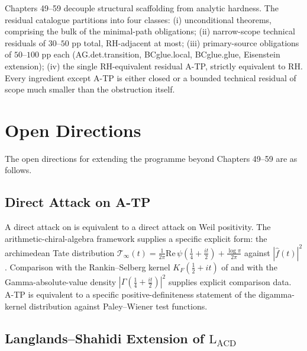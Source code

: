 \begin{remark}
\label{v4-arith:w5-synth:rem:irreducible}
Chapters 49--59 decouple structural scaffolding from analytic hardness.
The residual catalogue partitions into four classes: (i) unconditional
theorems, comprising the bulk of the minimal-path obligations; (ii)
narrow-scope technical residuals of \(30\)--\(50\) pp total, RH-adjacent
at most; (iii) primary-source obligations of \(50\)--\(100\) pp each
(AG.det.transition, BCglue.local, BCglue.glue, Eisenstein extension);
(iv) the single RH-equivalent residual A-TP, strictly equivalent to
RH. Every ingredient except A-TP is either closed or a bounded
technical residual of scope much smaller than the obstruction itself.
\end{remark}

\section{Open Directions}
\label{v4-arith:w5-synth:path-forward}

The open directions for extending the programme beyond Chapters 49--59
are as follows.

\subsection{Direct Attack on A-TP}
\label{v4-arith:w5-synth:direct-ATP}

A direct attack on 
is equivalent to a direct attack on Weil positivity. The
arithmetic-chiral-algebra framework supplies a specific explicit
form: the archimedean Tate distribution
\(\mathcal{T}_{\infty}(t)=\frac{1}{2\pi}\mathrm{Re}\,\psi(\frac{1}{4}+\frac{it}{2})+\frac{\log\pi}{2\pi}\)
against \(|\widehat{f}(t)|^{2}\). Comparison with the
Rankin--Selberg kernel
\(K_{F}(\frac{1}{2}+it)\) of 
and with the Gamma-absolute-value density
\(|\Gamma(\frac{1}{4}+\frac{it}{2})|^{2}\) supplies explicit
comparison data. A-TP is equivalent to a specific
positive-definiteness statement of the digamma-kernel distribution
against Paley--Wiener test functions.

\subsection{Langlands--Shahidi Extension of \(\mathrm{L}_{\mathrm{ACD}}\)}
\label{v4-arith:w5-synth:LS-extension}

